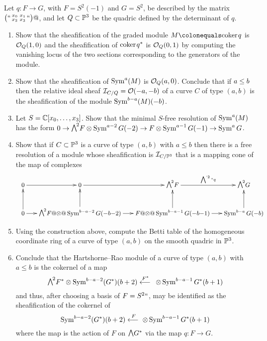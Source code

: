 \begin{exercise}\label{resolutions of curves on a quadric}
Let $q:F\to G$, with $F = S^2(-1)$ and $G = S^2$,
be described by the matrix $\bigl(` `\begin{smallmatrix} x_0&x_1\\ x_2&x_3 \end{smallmatrix}` `\bigr)@$, and let $Q\subset {\mathbb P}^3$ be the quadric defined by the determinant of $q$.

\begin{enumerate}
\item Show that the sheafification of the graded module $M \colonequals
\coker q$ is ${\mathcal O}_Q(1,0)$ and the sheafification
of ${\rm{coker}\kern1pt} q^*$ is ${\mathcal O}_Q(0,1)$ by computing the vanishing locus
of the two sections corresponding to the generators of the module.

\item Show that the sheafification of $\operatorname{Sym}^a(M)$ is
${\mathcal O}_Q(a,0)$. Conclude that
if $a\leq \nobreak b$ then the relative ideal sheaf ${\mathcal I}_{C/Q} = {\mathcal O}(-a,-b)$
of a curve $C$ of type $(a,b)$
is the sheafification of the module $\operatorname{Sym}^{b-a}(M)(-b)$.

\item Let $S = {\mathbb C}[x_0,\dots, x_3]$. Show that the minimal $S$-free
resolution of $\operatorname{Sym}^a(M)$
has the form
$0 \to \mwedge^2 F \otimes \Sym^{a-2} G(-2)\to F\otimes \Sym^{a-1}
G(-1)\to \Sym^a G$.

\item Show that if $C\subset {\mathbb P}^3$ is a curve of type $(a, b)$ with
$a\leq b$ then
there is a free resolution of a module
whose sheafification is ${\mathcal I}_{C/{\mathbb P}^3}$ that is a mapping cone of the
map of complexes
\vspace*{-5pt}
$$
\small
\quad
\medmuskip0mu
\xymatrix@C=15pt{
0\ar[r]  &0\ar[r]& \mwedge^2 F \ar[r]^ {\ssty\bigwedge^{`2}``q}&\mwedge^2 G\\
0\ar[r]\ar[u]  & \mwedge^2 F @\otimes@ \Sym^{b-a-2} G(-b-2) \ar[r]\ar[u]  
&F @\otimes@\Sym^{b-a-1} G(-b-1) \ar[r]\ar[u]& \Sym^{b-a} G(-b)\ar[u]
}
\vspace*{2pt}
$$

\item Using the construction above, compute the Betti table of the homogeneous
coordinate ring of a curve of type $(a,b)$ on the smooth quadric in ${\mathbb P}^{3}$.

\item Conclude that the Hartshorne--Rao module of a curve of type $(a, b)$
%
with $a\leq b$ is the cokernel of a map
$$
\mwedge^2 F^* \otimes \Sym^{b-a-2} (G^*)(b+2) \luto{\,F^*}\otimes \Sym^{b-a-1}
G^*(b+1)
$$
and thus, after choosing a basis of $F = S^2` `$, may be identified as
the sheafification of the cokernel of
$$
\Sym^{b-a-2} (G^*)(b+2) \luto {\ F}\otimes \Sym^{b-a-1} G^*(b+1)
$$
where the map is the action of $F$ on $\mwedge \,G^*$ via the map $q:F\to G$.
\end{enumerate}
\end{exercise}

